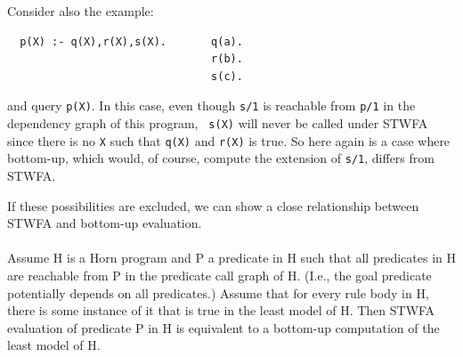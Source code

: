 Consider also the example:
\footnotesize
\begin{verbatim}
  p(X) :- q(X),r(X),s(X).       q(a).
                                r(b).
                                s(c).
\end{verbatim}
\normalsize
and query {\tt p(X)}.  In this case, even though {\tt s/1} is
reachable from {\tt p/1} in the dependency graph of this program, {\tt
  s(X)} will never be called under STWFA since there is no {\tt X}
such that {\tt q(X)} and {\tt r(X)} is true.  So here again is a case
where bottom-up, which would, of course, compute the extension of
\verb|s/1|, differs from STWFA.

If these possibilities are excluded, we can show a close relationship
between STWFA and bottom-up evaluation.\\

\\
Assume H is a Horn program and P a predicate in H such that all
predicates in H are reachable from P in the predicate call graph of
H. (I.e., the goal predicate potentially depends on all predicates.)
Assume that for every rule body in H, there is some instance of it
that is true in the least model of H.  Then STWFA evaluation of
predicate P in H is equivalent to a bottom-up computation of the least
model of H.


